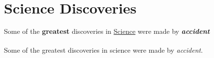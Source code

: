 \documentclass{article}
\begin{document}
	\section{Science Discoveries}
	Some of the \textbf{greatest}
	discoveries in \underline{Science}
	were made by
	\textbf{\textit{accident}}
	
	\paragraph{}
	Some of the greatest discoveries in science were made by \emph{accident}.
\end{document}
